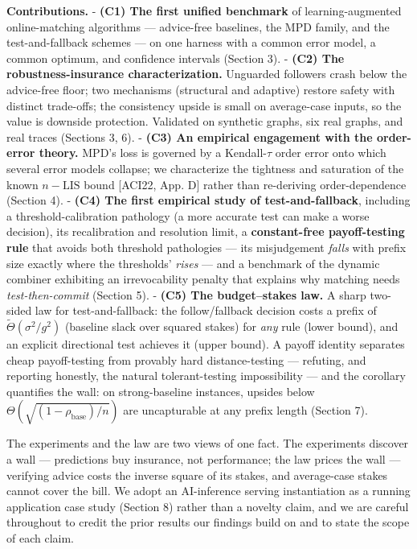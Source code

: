 \textbf{Contributions.} - \textbf{(C1) The first unified benchmark} of
learning-augmented online-matching algorithms --- advice-free baselines,
the MPD family, and the test-and-fallback schemes --- on one harness
with a common error model, a common optimum, and confidence intervals
(Section 3). - \textbf{(C2) The robustness-insurance characterization.}
Unguarded followers crash below the advice-free floor; two mechanisms
(structural and adaptive) restore safety with distinct trade-offs; the
consistency upside is small on average-case inputs, so the value is
downside protection. Validated on synthetic graphs, six real graphs, and
real traces (Sections 3, 6). - \textbf{(C3) An empirical engagement with
the order-error theory.} MPD's loss is governed by a Kendall-\(\tau\)
order error onto which several error models collapse; we characterize
the tightness and saturation of the known \(n{-}\mathrm{LIS}\) bound
{[}ACI22, App. D{]} rather than re-deriving order-dependence (Section
4). - \textbf{(C4) The first empirical study of test-and-fallback},
including a threshold-calibration pathology (a more accurate test can
make a worse decision), its recalibration and resolution limit, a
\textbf{constant-free payoff-testing rule} that avoids both threshold
pathologies --- its misjudgement \emph{falls} with prefix size exactly
where the thresholds' \emph{rises} --- and a benchmark of the dynamic
combiner exhibiting an irrevocability penalty that explains why matching
needs \emph{test-then-commit} (Section 5). - \textbf{(C5) The
budget--stakes law.} A sharp two-sided law for test-and-fallback: the
follow/fallback decision costs a prefix of
\(\tilde\Theta(\sigma^2/g^2)\) (baseline slack over squared stakes) for
\emph{any} rule (lower bound), and an explicit directional test achieves
it (upper bound). A payoff identity separates cheap payoff-testing from
provably hard distance-testing --- refuting, and reporting honestly, the
natural tolerant-testing impossibility --- and the corollary quantifies
the wall: on strong-baseline instances, upsides below
\(\Theta(\sqrt{(1-\rho_{\mathrm{base}})/n})\) are uncapturable at any
prefix length (Section 7).

The experiments and the law are two views of one fact. The experiments
discover a wall --- predictions buy insurance, not performance; the law
prices the wall --- verifying advice costs the inverse square of its
stakes, and average-case stakes cannot cover the bill. We adopt an
AI-inference serving instantiation as a running application case study
(Section 8) rather than a novelty claim, and we are careful throughout
to credit the prior results our findings build on and to state the scope
of each claim.
